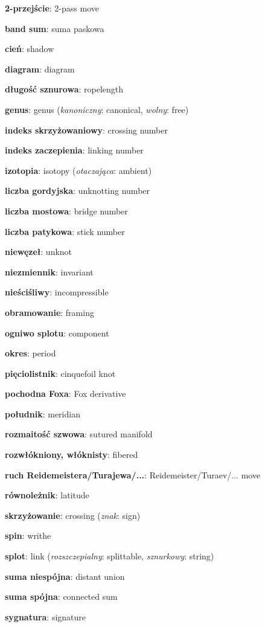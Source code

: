 \item \textbf{2-przejście}: 2-pass move
\item \textbf{band sum}: suma paskowa
\item \textbf{cień}: shadow
\item \textbf{diagram}: diagram
\item \textbf{długość sznurowa}: ropelength
\item \textbf{genus}: genus
(\emph{kanoniczny}: canonical, \emph{wolny}: free)
\item \textbf{indeks skrzyżowaniowy}: crossing number
\item \textbf{indeks zaczepienia}: linking number
\item \textbf{izotopia}: isotopy
(\emph{otaczająca}: ambient)
\item \textbf{liczba gordyjska}: unknotting number
\item \textbf{liczba mostowa}: bridge number
\item \textbf{liczba patykowa}: stick number
\item \textbf{niewęzeł}: unknot
\item \textbf{niezmiennik}: invariant
\item \textbf{nieściśliwy}: incompressible
\item \textbf{obramowanie}: framing
\item \textbf{ogniwo splotu}: component
\item \textbf{okres}: period
\item \textbf{pięciolistnik}: cinquefoil knot
\item \textbf{pochodna Foxa}: Fox derivative
\item \textbf{południk}: meridian
\item \textbf{rozmaitość szwowa}: sutured manifold
\item \textbf{rozwłókniony, włóknisty}: fibered
\item \textbf{ruch Reidemeistera/Turajewa/...}: Reidemeister/Turaev/... move
\item \textbf{równoleżnik}: latitude
\item \textbf{skrzyżowanie}: crossing
(\emph{znak}: sign)
\item \textbf{spin}: writhe
\item \textbf{splot}: link
(\emph{rozszczepialny}: splittable, \emph{sznurkowy}: string)
\item \textbf{suma niespójna}: distant union
\item \textbf{suma spójna}: connected sum
\item \textbf{sygnatura}: signature
